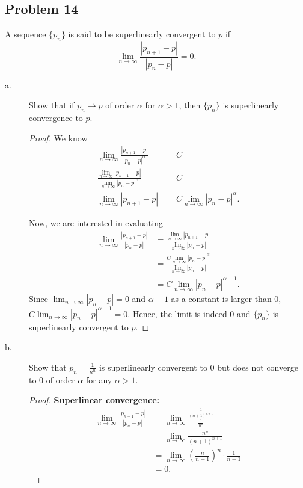 \documentclass{article}
\begin{document}
\subsection*{Problem 14}
A sequence $\{p_n\}$ is said to be superlinearly convergent to $p$ if 
$$\lim_{n\to\infty}\frac{|p_{n+1}-p|}{|p_n-p|}=0.$$
\begin{description}
    \item[a.] Show that if $p_n\rightarrow p$ of order $\alpha$ for $\alpha>1$, then $\{p_n\}$ 
    is superlinearly convergence to $p$.
    \begin{proof}
        We know 
        \begin{align*}
            \lim_{n\rightarrow\infty}\frac{|p_{n+1}-p|}{|p_n-p|^\alpha} & = C \\
            \frac{\lim_{n\rightarrow\infty}|p_{n+1}-p|}{\lim_{n\rightarrow\infty}|p_n-p|^\alpha} & = C \\
            \lim_{n\rightarrow\infty}|p_{n+1}-p| & = C\lim_{n\rightarrow\infty}|p_n-p|^\alpha.
        \end{align*}
        
        Now, we are interested in evaluating 
        \begin{align*}
            \lim_{n\rightarrow\infty}\frac{|p_{n+1}-p|}{|p_n-p|} & = 
            \frac{\lim_{n\rightarrow\infty}|p_{n+1}-p|}{\lim_{n\rightarrow\infty}|p_n-p|} \\
            & = \frac{C\lim_{n\rightarrow\infty}|p_n-p|^\alpha}{\lim_{n\rightarrow\infty}|p_n-p|} \\
            & = C\lim_{n\rightarrow\infty}|p_n-p|^{\alpha-1}.
        \end{align*}
        Since $\lim_{n\rightarrow\infty}|p_n-p|=0$ and $\alpha-1$ as a constant is larger than 0, 
        $C\lim_{n\rightarrow\infty}|p_n-p|^{\alpha-1}=0$. Hence, the limit is indeed 0 and 
        $\{p_n\}$ is superlinearly convergent to $p$.
    \end{proof}

    \item[b.] Show that $p_n=\frac{1}{n^n}$ is superlinearly convergent to 0 but does not 
    converge to 0 of order $\alpha$ for any $\alpha>1$.
    \begin{proof}
        \textbf{Superlinear convergence:}
        \begin{align*}
            \lim_{n\rightarrow\infty}\frac{|p_{n+1}-p|}{|p_n-p|} & = 
            \lim_{n\rightarrow\infty}\frac{\frac{1}{(n+1)^{n+1}}}{\frac{1}{n^n}} \\
            & = \lim_{n\rightarrow\infty}\frac{n^n}{(n+1)^{n+1}} \\
            & = \lim_{n\rightarrow\infty}\left(\frac{n}{n+1}\right)^n\cdot\frac{1}{n+1} \\
            & = 0.
        \end{align*}


\end{proof}
\end{description}
\end{document}
